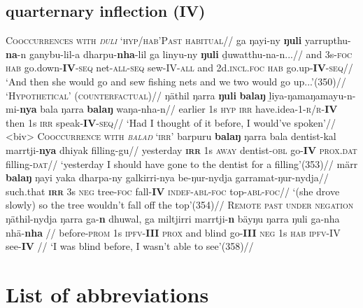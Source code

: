 \documentclass[12pt]{article}
\begin{document}
\subsection{quarternary inflection (IV)}
\pex{}\textsc{Cooccurrences with \textit{ŋuli} `hyp/hab'}\a\begingl\glpreamble\textsc{Past habitual}//
\gla ga ŋayi-ny \textbf{ŋuli} yarrupthu-\textbf{na}-n ganybu-lil-a dharpu-\textbf{nha}-lil ga linyu-ny \textbf{ŋuli} ḏuwatthu-na-n...//
\glb  and 3s-\textsc{foc} \textsc{hab} go.down-\textbf{IV}-\textsc{seq} net\textsc{-all-seq} sew-IV\textsc{-all} and 2d\textsc{.incl.foc} \textsc{hab} go.up-\textbf{IV}\textsc{-seq}//
\glft`And then she  would go and sew fishing nets and we two  would go up...'\hfill(350)//
\endgl
\a{}\begingl\glpreamble\textsc{`Hypothetical' (counterfactual)}//
\gla ŋäthil ŋarra \textbf{ŋuli} \textbf{balaŋ} ḻiya-ŋamaŋamayu-n-mi-\textbf{nya} bala ŋarra \textbf{balaŋ} waŋa-nha-n//
\glb earlier 1s \textsc{hyp} \textsc{irr} have.idea-1-\textsc{r/r}-\textbf{IV} then 1s \textsc{irr} speak-\textbf{IV}-\textsc{seq}//
\glft`Had I thought of it before, I would've spoken'//
\endgl\xe
\pex[]<biv> \textsc{Cooccurrence with \textit{balaŋ} `irr'}
\a\begingl
\gla barpuru \textbf{balaŋ} ŋarra bala dentist-kal marrtji-\textbf{nya} dhiyak filling-gu//
\glb yesterday \textsc{\textbf{irr}} 1s \textsc{away} dentist-\textsc{obl} go-\textbf{IV} \textsc{prox.dat} filling\textsc{-dat}//
\glft`yesterday I should have gone to the dentist for a filling'\hfill(353)//
\endgl
\a\begingl
\gla märr \textbf{balaŋ} ŋayi yaka dharpa-ny galkirri-nya be-ŋur-nydja garramat-ŋur-nydja//
\glb such.that \textsc{\textbf{irr}} 3s \textsc{neg} tree-\textsc{foc} fall-\textbf{IV} \textsc{indef-abl-foc} top-\textsc{abl-foc}//
\glft`(she drove slowly) so the tree wouldn't fall off the top'\hfill(354)//
\endgl
\xe
\pex\textsc{Remote past under negation}\\
\begingl\gla ŋäthil-nydja ŋarra ga-\textbf{n} dhuwal, ga miltjirri marrtji-\textbf{n} bäyŋu ŋarra ŋuli ga-nha nhä-\textbf{nha}	//
\glb before\textsc{-prom} 1s \textsc{ipfv-\textbf{III}} \textsc{prox} and blind go\textsc{-\textbf{III}} \textsc{neg} 1s \textsc{hab} \textsc{ipfv-IV} see-\textbf{IV}	//
	\glft`I was blind before, I wasn't able to see'\hfill(358)//
\endgl\xe
\vfill\setcounter{secnumdepth}{0}\section{List of abbreviations}
\end{document}
